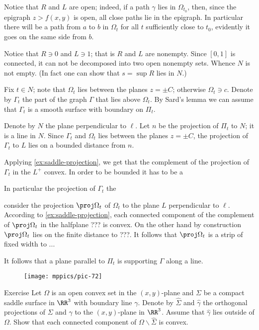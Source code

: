 Notice that $R$ and $L$ are open; indeed, if a path $\gamma$ lies in $\Omega_{t_0}$, then, since the epigraph $z>f(x,y)$ is open, all close paths lie in the epigraph.
In particular there will be a path from $a$ to $b$ in $\Omega_t$ for all $t$ sufficiently close to $t_0$,
evidently it goes on the same side from $b$.

Notice that $R\ni 0$ and $L\ni 1$; that is $R$ and $L$ are nonempty.
Since $[0,1]$ is connected, it can not be decomposed into two open nonempty sets.
Whence $N$ is not empty.
(In fact one can show that $s=\sup R$ lies in $N$.)


Fix $t\in N$; note that $\Omega_t$ lies between the planes $z=\pm C$;
otherwise $\Omega_t\ni c$.
Denote by $\Gamma_t$ the part of the graph $\Gamma$ that lies above $\Omega_t$.
By Sard's lemma we can assume that $\Gamma_t$ is a smooth surface with boundary on $\Pi_t$.

Denote by $N$ the plane perpendicular to $\ell$.
Let $n$ be the projection of $\Pi_t$ to $N$; 
it is a line in $N$.
Since $\Gamma_t$ and $\Omega_t$ lies between the planes $z=\pm C$, the projection of $\Gamma_t$ to $L$ lies on a bounded distance from $n$.

Applying \ref{ex:saddle-projection}, we get that the complement of the projection of $\Gamma_t$ in the $L^+$ convex. 
In order to be bounded it has to be a 


In particular the projection of $\Gamma_t$ the 

consider the projection $\proj\Omega_t$ of $\Omega_t$ to the plane $L$ perpendicular to $\ell$.
According to \ref{ex:saddle-projection},
each connected component of the complement of $\proj\Omega_t$  in the halfplane ??? is convex.
On the other hand by construction $\proj\Omega_t$ lies on the finite distance to ???.
It follows that $\proj\Omega_t$ is a strip of fixed width to ...

It follows that a plane parallel to $\Pi_t$ is supporting $\Gamma$ along a line.

\qeds

\begin{wrapfigure}{o}{40 mm}
\vskip-0mm
\centering
\texttt{[image: mppics/pic-72]}
\vskip0mm
\end{wrapfigure}

\begin{thm}{Exercise}\label{ex:saddle-projection}
Let $\Omega$ is an open convex set in the $(x,y)$-plane and 
$\Sigma$ be a compact saddle surface in $\RR^3$ with boundary line $\gamma$.
Denote by $\hat \Sigma$ and $\hat\gamma$ the orthogonal projections of $\Sigma$ and $\gamma$ to the $(x,y)$-plane in $\RR^3$.
Assume that $\hat\gamma$ lies outside of $\Omega$.
Show that each connected component of $\Omega\backslash \hat\Sigma$ is convex. 
\end{thm}


